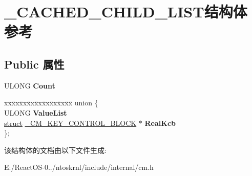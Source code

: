 \hypertarget{struct___c_a_c_h_e_d___c_h_i_l_d___l_i_s_t}{}\section{\+\_\+\+C\+A\+C\+H\+E\+D\+\_\+\+C\+H\+I\+L\+D\+\_\+\+L\+I\+S\+T结构体 参考}
\label{struct___c_a_c_h_e_d___c_h_i_l_d___l_i_s_t}
\subsection*{Public 属性}
\begin{DoxyCompactItemize}
\item 
\mbox{\label{struct___c_a_c_h_e_d___c_h_i_l_d___l_i_s_t_a9c60324e03154bccd4dfe48defe973e2}} 
U\+L\+O\+NG {\bfseries Count}
\item 
\mbox{\label{struct___c_a_c_h_e_d___c_h_i_l_d___l_i_s_t_ab64aa773640d87939737210dad50b73c}} 
\begin{tabbing}
xx\=xx\=xx\=xx\=xx\=xx\=xx\=xx\=xx\=\kill
union \{\\
\>ULONG {\bfseries ValueList}\\
\>\hyperlink{interfacestruct}{struct} \hyperlink{struct___c_m___k_e_y___c_o_n_t_r_o_l___b_l_o_c_k}{\_CM\_KEY\_CONTROL\_BLOCK} $\ast$ {\bfseries RealKcb}\\
\}; \\

\end{tabbing}\end{DoxyCompactItemize}


该结构体的文档由以下文件生成\+:\begin{DoxyCompactItemize}
\item 
E\+:/\+React\+O\+S-\/0../ntoskrnl/include/internal/cm.\+h\end{DoxyCompactItemize}
